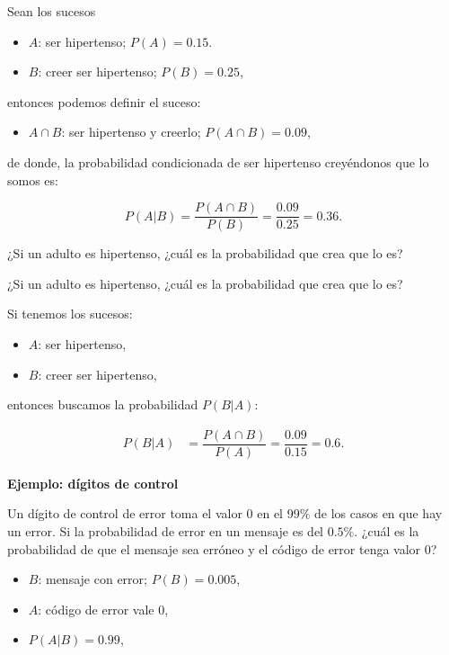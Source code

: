 \documentclass[]{book}
\providecommand{\tightlist}{%
  \setlength{\itemsep}{0pt}\setlength{\parskip}{0pt}}
\begin{document}
Sean los sucesos

\begin{itemize}
\tightlist
\item
  \(A\): ser hipertenso; \(P(A)=0.15\).
\item
  \(B\): creer ser hipertenso; \(P(B)=0.25\),
\end{itemize}

entonces podemos definir el suceso:

\begin{itemize}
\tightlist
\item
  \(A\cap B\): ser hipertenso y creerlo; \(P(A\cap B)=0.09\),
\end{itemize}

de donde, la probabilidad condicionada de ser hipertenso creyéndonos que lo somos es:

\[P(A|B)=\dfrac{P(A\cap B)}{P(B)}=\dfrac{0.09}{0.25}=0.36.\]

¿Si un adulto es hipertenso, ¿cuál es la probabilidad que crea que lo es?

¿Si un adulto es hipertenso, ¿cuál es la probabilidad que crea que lo es?

Si tenemos los sucesos:

\begin{itemize}
\tightlist
\item
  \(A\): ser hipertenso,
\item
  \(B\): creer ser hipertenso,
\end{itemize}

entonces buscamos la probabilidad \(P(B|A)\):

\[
\begin{array}{rl}
P(B|A) & =\dfrac{P(A\cap B)}{P(A)}=\dfrac{0.09}{0.15}=
0.6.
\end{array}
\]

\textbf{Ejemplo: dígitos de control}

Un dígito de control de error toma el valor 0 en el 99\% de los casos en que hay un error. Si la probabilidad de error en un mensaje es del \(0.5\%\). ¿cuál es la probabilidad de que el mensaje sea erróneo y el código de error tenga valor 0?

\begin{itemize}
\tightlist
\item
  \(B\): mensaje con error; \(P(B)=0.005\),
\item
  \(A\): código de error vale 0,
\item
  \(P(A|B)=0.99\),
\end{itemize}
\end{document}

